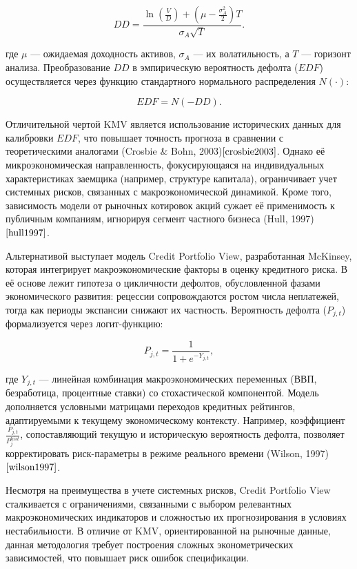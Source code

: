 \documentclass[]{article}
\begin{document}
	\[
	DD = \frac{\ln\left(\frac{V}{D}\right) + \left(\mu - \frac{\sigma_A^2}{2}\right)T}{\sigma_A \sqrt{T}}.  
	\]  
	
	где \(\mu\) — ожидаемая доходность активов, \(\sigma_A\) — их волатильность, а \(T\) — горизонт анализа. Преобразование \(DD\) в эмпирическую вероятность дефолта (\(EDF\)) осуществляется через функцию стандартного нормального распределения \(N(\cdot)\):  
	
	\[
	EDF = N(-DD).
	\]  
	
	Отличительной чертой KMV является использование исторических данных для калибровки \(EDF\), что повышает точность прогноза в сравнении с теоретическими аналогами (Crosbie \& Bohn, 2003)$\cite{crosbie2003}$. Однако её микроэкономическая направленность, фокусирующаяся на индивидуальных характеристиках заемщика (например, структуре капитала), ограничивает учет системных рисков, связанных с макроэкономической динамикой. Кроме того, зависимость модели от рыночных котировок акций сужает её применимость к публичным компаниям, игнорируя сегмент частного бизнеса (Hull, 1997)$\cite{hull1997}$.  
	
	Альтернативой выступает модель Credit Portfolio View, разработанная McKinsey, которая интегрирует макроэкономические факторы в оценку кредитного риска. В её основе лежит гипотеза о цикличности дефолтов, обусловленной фазами экономического развития: рецессии сопровождаются ростом числа неплатежей, тогда как периоды экспансии снижают их частность. Вероятность дефолта (\(P_{j,t}\)) формализуется через логит-функцию:  
	
	\[
	P_{j,t} = \frac{1}{1 + e^{-Y_{j,t}}},
	\]  
	
	где \(Y_{j,t}\) — линейная комбинация макроэкономических переменных (ВВП, безработица, процентные ставки) со стохастической компонентой. Модель дополняется условными матрицами переходов кредитных рейтингов, адаптируемыми к текущему экономическому контексту. Например, коэффициент \(\frac{P_{j,t}}{P_{j}^{hist}}\), сопоставляющий текущую и историческую вероятность дефолта, позволяет корректировать риск-параметры в режиме реального времени (Wilson, 1997)$\cite{wilson1997}$.  
	
	Несмотря на преимущества в учете системных рисков, Credit Portfolio View сталкивается с ограничениями, связанными с выбором релевантных макроэкономических индикаторов и сложностью их прогнозирования в условиях нестабильности. В отличие от KMV, ориентированной на рыночные данные, данная методология требует построения сложных эконометрических зависимостей, что повышает риск ошибок спецификации.  
	
\end{document}

